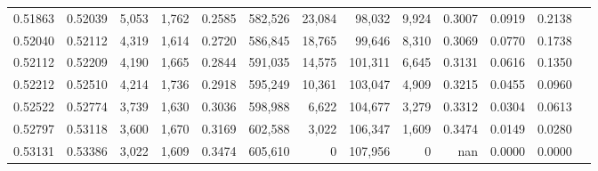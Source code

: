 \begin{tabular}{rrrrrrrrrrrrr}
0.51863 & 0.52039 &  5,053 & 1,762 &                                     0.2585 & 582,526 &  23,084 &  98,032 &   9,924 & 0.3007 & 0.0919 & 0.2138 \\
0.52040 & 0.52112 &  4,319 & 1,614 &                                     0.2720 & 586,845 &  18,765 &  99,646 &   8,310 & 0.3069 & 0.0770 & 0.1738 \\
0.52112 & 0.52209 &  4,190 & 1,665 &                                     0.2844 & 591,035 &  14,575 & 101,311 &   6,645 & 0.3131 & 0.0616 & 0.1350 \\
0.52212 & 0.52510 &  4,214 & 1,736 &                                     0.2918 & 595,249 &  10,361 & 103,047 &   4,909 & 0.3215 & 0.0455 & 0.0960 \\
0.52522 & 0.52774 &  3,739 & 1,630 &                                     0.3036 & 598,988 &   6,622 & 104,677 &   3,279 & 0.3312 & 0.0304 & 0.0613 \\
0.52797 & 0.53118 &  3,600 & 1,670 &                                     0.3169 & 602,588 &   3,022 & 106,347 &   1,609 & 0.3474 & 0.0149 & 0.0280 \\
0.53131 & 0.53386 &  3,022 & 1,609 &                                     0.3474 & 605,610 &       0 & 107,956 &       0 &    nan & 0.0000 & 0.0000 \\
\bottomrule
\end{tabular}
